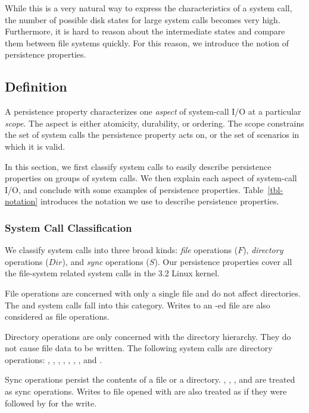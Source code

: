 While this is a very natural way to express the characteristics of a system
call, the number of possible disk states for large system calls becomes very
high. Furthermore, it is hard to reason about the intermediate states and
compare them between file systems quickly. For this reason, we introduce the
notion of persistence properties.      
\fi

\subsection{Definition}
\label{sec-definition}
A persistence property characterizes one \textit{aspect} of system-call I/O at
a particular \textit{scope}. The aspect is either atomicity, durability, or
ordering. The scope constrains the set of system calls the persistence property
acts on, or the set of scenarios in which it is valid. 


In this section, we first classify system calls to easily describe persistence
properties on groups of system calls. We then explain each aspect of
system-call I/O, and conclude with some examples of persistence properties.
Table~\ref{tbl-notation} introduces the notation we use to describe persistence
properties. 

\subsubsection{System Call Classification} 
We classify system calls into three broad kinds: \textit{file} operations
($F$), \textit{directory} operations ($Dir$), and \textit{sync} operations
($S$). Our persistence properties cover all the file-system related system
calls in the 3.2 Linux kernel.

File operations are concerned with only a single file and do not affect
directories.  The  and  system calls fall
into this category. Writes to an -ed file are also considered
as file operations.

Directory operations are only concerned with the directory hierarchy. They do
not cause file data to be written. The following system calls are directory
operations:  , , ,
, , , ,
and . 

Sync operations persist the contents of a file or a directory.
, , , and
 are treated as sync operations. Writes to file opened with
 are also treated as if they were followed by
 for the write.   

